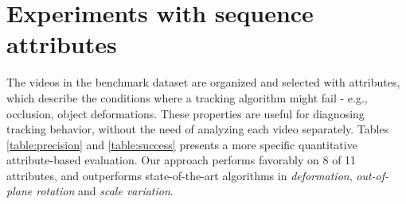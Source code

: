 \section{Experiments with sequence attributes}

The videos in the benchmark dataset are organized and selected with attributes, which describe the conditions where a tracking algorithm might fail - e.g., occlusion, object deformations. These properties are useful for diagnosing tracking behavior, without the need of analyzing each video separately. Tables \ref{table:precision} and \ref{table:success} presents a more specific quantitative attribute-based evaluation. Our approach performs favorably on 8 of 11 attributes, and outperforms state-of-the-art algorithms in \textit{deformation}, \textit{out-of-plane rotation} and \textit{scale variation}. 
